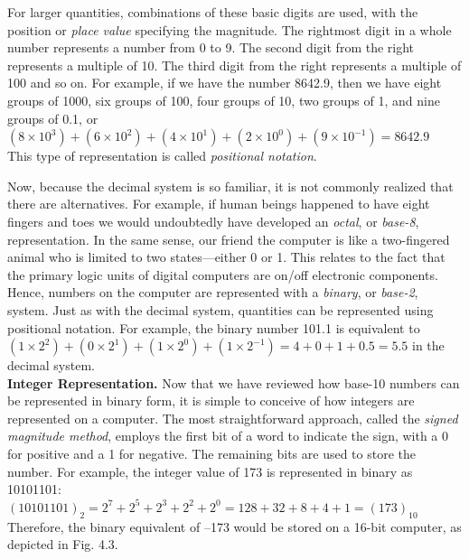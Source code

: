 \documentclass[../main.tex]{subfiles}
\begin{document}
For larger quantities, combinations of these basic digits are used, with the position or
\emph{place value} specifying the magnitude. The rightmost digit in a whole number represents a
number from 0 to 9. The second digit from the right represents a multiple of 10. The third
digit from the right represents a multiple of 100 and so on. For example, if we have the
number 8642.9, then we have eight groups of 1000, six groups of 100, four groups of 10,
two groups of 1, and nine groups of 0.1, or\\

$(8 \times 10^3) + (6 \times 10^2) + (4 \times 10^1) + (2 \times 10^0) + (9 \times 10^{-1}) = 8642.9$\\

\noindent
This type of representation is called \emph{positional notation}.

Now, because the decimal system is so familiar, it is not commonly realized that
there are alternatives. For example, if human beings happened to have eight fingers and
toes we would undoubtedly have developed an \emph{octal}, or \emph{base-8}, representation. In the
same sense, our friend the computer is like a two-fingered animal who is limited to two
states---either 0 or 1. This relates to the fact that the primary logic units of digital computers
are on/off electronic components. Hence, numbers on the computer are represented
with a \emph{binary}, or \emph{base-2}, system. Just as with the decimal system, quantities
can be represented using positional notation. For example, the binary number 101.1 is
equivalent to $(1 \times 2^2)+(0 \times 2^1) + (1 \times 2^0) + (1 \times 2^{-1}) = 4 + 0 + 1 + 0.5 = 5.5$ in the
decimal system.\\

\noindent
\textbf{Integer Representation.}\quad
Now that we have reviewed how base-10 numbers can be represented
in binary form, it is simple to conceive of how integers are represented on a computer.
The most straightforward approach, called the \emph{signed magnitude method}, employs
the first bit of a word to indicate the sign, with a 0 for positive and a 1 for negative. The remaining
bits are used to store the number. For example, the integer value of 173 is represented
in binary as 10101101:\\

$(10101101)_2= 2^7 + 2^5 + 2^3 + 2^2 + 2^0 = 128 + 32 + 8 + 4 + 1 = (173)_{10}$\\

\noindent
Therefore, the binary equivalent of --173 would be stored on a 16-bit computer, as depicted
in Fig. 4.3.
\end{document}
